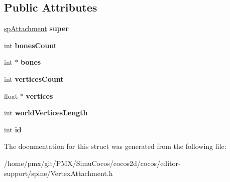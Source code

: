 \subsection*{Public Attributes}
\begin{DoxyCompactItemize}
\item 
\mbox{\label{structspVertexAttachment_af11ff02dc21d2dee7bdc98d316892708}} 
\hyperlink{structspAttachment}{sp\+Attachment} {\bfseries super}
\item 
\mbox{\label{structspVertexAttachment_a49d3ad49023eb9129507715a5b1a0e9d}} 
int {\bfseries bones\+Count}
\item 
\mbox{\label{structspVertexAttachment_a33269b98793db6bafc96346838563f40}} 
int $\ast$ {\bfseries bones}
\item 
\mbox{\label{structspVertexAttachment_aa320bfb9f6beea9716300086cc168a42}} 
int {\bfseries vertices\+Count}
\item 
\mbox{\label{structspVertexAttachment_a661aa5b9ba1b8fdf9caf340500afc7ba}} 
float $\ast$ {\bfseries vertices}
\item 
\mbox{\label{structspVertexAttachment_a568ebd114850134843d1fd9dec2582f0}} 
int {\bfseries world\+Vertices\+Length}
\item 
\mbox{\label{structspVertexAttachment_ad01c408ea491802999329c1cbd1dacc8}} 
int {\bfseries id}
\end{DoxyCompactItemize}


The documentation for this struct was generated from the following file\+:\begin{DoxyCompactItemize}
\item 
/home/pmx/git/\+P\+M\+X/\+Simu\+Cocos/cocos2d/cocos/editor-\/support/spine/Vertex\+Attachment.\+h\end{DoxyCompactItemize}
